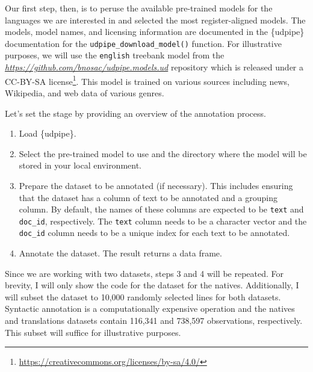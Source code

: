 \documentclass[
  letterpaper,
  krantz1]{latex/krantz-mod}
\providecommand{\tightlist}{%
  \setlength{\itemsep}{0pt}\setlength{\parskip}{0pt}}\usepackage{longtable,booktabs,array}
\theoremstyle{definition}
\theoremstyle{definition}
\theoremstyle{remark}
\DeclareRobustCommand{\href}[2]{#2\footnote{\url{#1}}}
\begin{document}
Our first step, then, is to peruse the available pre-trained models for
the languages we are interested in and selected the most
register-aligned models. The models, model names,
and licensing information are documented in the \{udpipe\} documentation
for the \texttt{udpipe\_download\_model()} function.
For illustrative purposes, we will use the \texttt{english} treebank
model from the \emph{\url{https://github.com/bnosac/udpipe.models.ud}}
repository which is released under a
\href{https://creativecommons.org/licenses/by-sa/4.0/}{CC-BY-SA
license}. This model is trained on various sources including news,
Wikipedia, and web data of various genres.

Let's set the stage by providing an overview of the annotation process.

\begin{enumerate}
\def\labelenumi{\arabic{enumi}.}
\tightlist
\item
  Load \{udpipe\}.
\item
  Select the pre-trained model to use and the directory where the model
  will be stored in your local environment.
\item
  Prepare the dataset to be annotated (if necessary). This includes
  ensuring that the dataset has a column of text to be annotated and a
  grouping column. By default, the names of these columns are expected
  to be \texttt{text} and \texttt{doc\_id}, respectively. The
  \texttt{text} column needs to be a character vector and the
  \texttt{doc\_id} column needs to be a unique index for each text to be
  annotated.
\item
  Annotate the dataset. The result returns a data frame.
\end{enumerate}

Since we are working with two datasets, steps 3 and 4 will be repeated.
For brevity, I will only show the code for the dataset for the natives.
Additionally, I will subset the dataset to 10,000 randomly selected
lines for both datasets. Syntactic annotation is a computationally
expensive operation and the natives and translations datasets contain
116,341 and 738,597 observations, respectively. This subset will suffice
for illustrative purposes.
\end{document}
